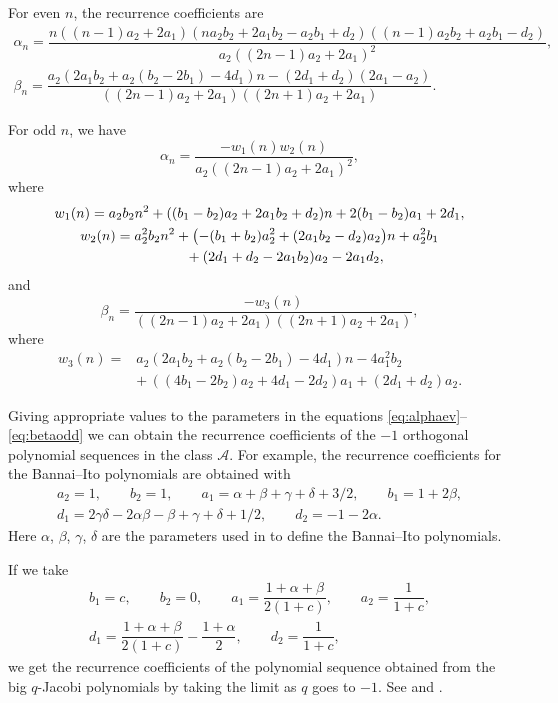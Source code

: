 \documentclass[pdftex]{sigma}
\def\cA{\mathcal A}
\numberwithin{equation}{section}
\begin{document}
For even $n$, the recurrence coefficients are
\begin{gather}\label{eq:alphaev}
	\alpha_n= \dfrac{n ((n-1)a_2 + 2 a_1) (n a_2 b_2+2 a_1 b_2 -a_2 b_1 + d_2)((n-1) a_2 b_2 + a_2 b_1 -d_2)}{a_2( (2 n-1) a_2 + 2 a_1)^2 },
\\
\label{eq:betaev}
\beta_n= \dfrac{a_2(2 a_1 b_2 +a_2(b_2-2 b_1)-4 d_1) n - (2 d_1+d_2)( 2 a_1 -a_2)}{((2n-1) a_2 + 2 a_1) ((2n+1) a_2 + 2 a_1)}.
\end{gather}

For odd $n$, we have
\begin{equation}\label{eq:alphaodd}
	\alpha_n= \dfrac{-w_1(n) w_2(n) }{a_2( (2 n-1) a_2 + 2 a_1)^2 },
\end{equation}
where
\begin{gather*}
w_1(n)=a_2 b_2 n^2+ ((b_1-b_2) a_2 + 2 a_1 b_2 + d_2) n + 2 (b_1-b_2) a_1 + 2 d_1,\\
w_2(n)=  a_2^2 b_2 n^2 + \bigl(- (b_1+ b_2) a_2^2 + ( 2 a_1 b_2 - d_2) a_2\bigr) n + a_2^2 b_1\\
\hphantom{w_2(n)=}{} + (2 d_1+ d_2- 2 a_1 b_2) a_2 - 2 a_1 d_2,
\end{gather*}
and
\begin{equation}\label{eq:betaodd}
	\beta_n= \dfrac{- w_3(n)}{((2 n-1) a_2 + 2 a_1) ( ( 2 n +1) a_2 + 2 a_1) },
\end{equation}
where
\begin{align*}
w_3(n)={}& a_2( 2 a_1 b_2 + a_2(b_2- 2 b_1)-4 d_1) n - 4 a_1^2 b_2\\
&{+}\,((4 b_1 -2 b_2) a_2 + 4 d_1- 2 d_2) a_1 + ( 2 d_1 + d_2) a_2.
\end{align*}

Giving appropriate values to the parameters in the equations \eqref{eq:alphaev}--\eqref{eq:betaodd} we can obtain the recurrence coefficients of the $-1$ orthogonal polynomial sequences in the class $\cA$. For example, the recurrence coefficients for the Bannai--Ito polynomials \cite{GenVZ} are obtained with
\begin{gather*}
a_2=1,\qquad b_2=1, \qquad a_1=\alpha+\beta +\gamma+ \delta+ 3/2 ,\qquad b_1=1 + 2 \beta, \\
d_1= 2 \gamma \delta -2 \alpha \beta - \beta + \gamma + \delta +1/2 , \qquad d_2=-1- 2 \alpha.
\end{gather*}
Here $\alpha$, $\beta$, $\gamma$, $\delta$ are the parameters used in \cite{GenVZ} to define the Bannai--Ito polynomials.

If we take
\begin{gather*}
b_1=c,\qquad b_2=0,\qquad a_1=\dfrac{1 +\alpha + \beta}{2 ( 1+c)},\qquad a_2=\dfrac{1}{1+c},\\
 d_1=\dfrac{1 +\alpha + \beta}{2 ( 1+c)}-\dfrac{1+\alpha}{2},\qquad d_2= \dfrac{1}{1+c},
 \end{gather*}
we get the recurrence coefficients of the polynomial sequence obtained from the big $q$-Jacobi polynomials by taking the limit as $q$ goes to $-1$. See \cite{CohlCS} and \cite{VZ2}.
\end{document}
